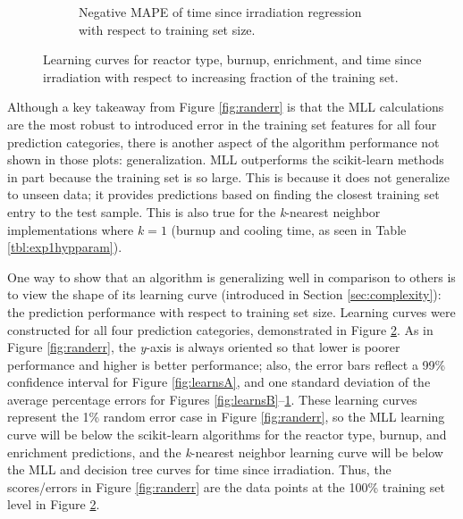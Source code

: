 \begin{figure}[!htb]
\begin{subfigure}[b]{0.49\textwidth}
        \caption{Negative \gls{MAPE} of time since irradiation regression with 
                 respect to training set size.}
        \label{fig:learnsD}
    \end{subfigure}
    \caption{Learning curves for reactor type, burnup, enrichment, and time 
             since irradiation with respect to increasing fraction of the 
             training set.}
    \label{fig:learns}
\end{figure}

Although a key takeaway from Figure \ref{fig:randerr} is that the \gls{MLL}
calculations are the most robust to introduced error in the training set
features for all four prediction categories, there is another aspect of the
algorithm performance not shown in those plots: generalization. \Gls{MLL}
outperforms the scikit-learn methods in part because the training set is so
large. This is because it does not generalize to unseen data; it provides
predictions based on finding the closest training set entry to the test sample.
This is also true for the \textit{k}-nearest neighbor implementations where
$k=1$ (burnup and cooling time, as seen in Table \ref{tbl:exp1hypparam}).

One way to show that an algorithm is generalizing well in comparison to others
is to view the shape of its learning curve (introduced in Section
\ref{sec:complexity}): the prediction performance with respect to training set
size.  Learning curves were constructed for all four prediction categories,
demonstrated in Figure \ref{fig:learns}. As in Figure \ref{fig:randerr}, the
\textit{y}-axis is always oriented so that lower is poorer performance and
higher is better performance; also, the error bars reflect a 99\% confidence
interval for Figure \ref{fig:learnsA}, and one standard deviation of the
average percentage errors for Figures \ref{fig:learnsB}--\ref{fig:learnsD}.
These learning curves represent the 1\% random error case in Figure
\ref{fig:randerr}, so the \gls{MLL} learning curve will be below the
scikit-learn algorithms for the reactor type, burnup, and enrichment
predictions, and the \textit{k}-nearest neighbor learning curve will be below
the \gls{MLL} and decision tree curves for time since irradiation.  Thus, the
scores/errors in Figure \ref{fig:randerr} are the data points at the 100\%
training set level in Figure \ref{fig:learns}.  

